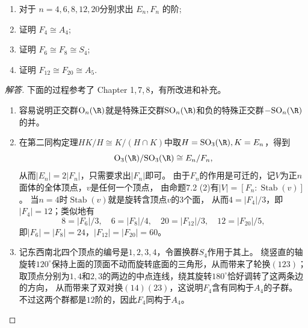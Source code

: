\begin{enumerate}
\begin{enumerate}[label=(\arabic*)]
称 $\mathbb{R}^3$ 中的正 $n$ 面体的自同构全体关于复合映射构成的群为正 $n$ 面体对称群, 记作 $E_n$, 其中 $n=4,6,8,12,20$;
将 $E_n$ 视作正交群 $\mathrm{O}_3(\mathbb{R})$ 的子群.称 $E_n \cap \mathrm{SO}_3(\mathbb{R})$ 为正 $n$ 面体旋转群,记作 $F_n$,其中 $n=4,6,8,12,20$.
\item 对于 $n=4,6,8,12,20$分别求出 $E_n, F_n$ 的阶;
\item 证明 $F_4 \cong A_4$;
\item 证明 $F_6 \cong F_8 \cong S_4$;
\item 证明 $F_{12} \cong F_{20} \cong A_5$.
\end{enumerate}
\begin{proof}[解答]
    下面的过程参考了\cite{Ar} Chapter 1,\,7,\,8，有所改进和补充。
    \begin{enumerate}[label=(\arabic*)]
    \item 容易说明正交群${\rm O}_n(\R)$就是特殊正交群${\rm SO}_n(\R)$和负的特殊正交群$-{\rm SO}_n(\R)$的并。
    \item 在第二同构定理$HK/H \cong K/(H \cap K)$中取$H={\rm SO}_3(\R),K=E_n$，得到
    \[{\rm O}_3(\R)/{\rm SO}_3(\R) \cong E_n/F_n,\]
    从而$|E_n|=2|F_n|$，只需要求出$|F_n|$即可。
    由于$F_n$的作用是可迁的，记$V$为正$n$面体的全体顶点，$v$是任何一个顶点，
    由命题7.2 (2)有$|V|=[F_n:\operatorname{Stab}(v)]$。
    当$n=4$时$\operatorname{Stab}(v)$就是旋转含顶点$v$的$3$个面，
    从而$4=|F_4|/3$，即$|F_4|=12$；类似地有
    \[8=|F_6|/3,\quad6=|F_8|/4,\quad20=|F_{12}|/3,\quad12=|F_{20}|/5,\]
    即$|F_6|=|F_8|=24$，$|F_{12}|=|F_{20}|=60$。
    \item 记东西南北四个顶点的编号是$1,2,3,4$，令置换群$S_4$作用于其上。
    绕竖直的轴旋转$120^\circ$保持上面的顶面不动而旋转底面的三角形，从而带来了轮换$(123)$；
    取顶点分别为$1,4$和$2,3$的两边的中点连线，绕其旋转$180^\circ$恰好调转了这两条边的方向，
    从而带来了双对换$(14)(23)$，这说明$F_4$含有同构于$A_4$的子群。
    不过这两个群都是$12$阶的，因此$F_4$同构于$A_4$。
\end{enumerate}
\end{proof}
\end{enumerate}
